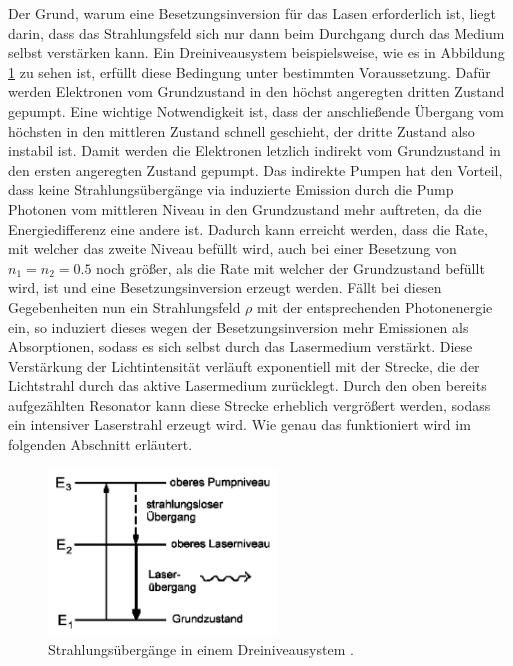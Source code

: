 Der Grund, warum eine Besetzungsinversion für das Lasen erforderlich ist, liegt darin, dass das
Strahlungsfeld sich nur dann beim Durchgang durch das Medium selbst verstärken kann.
Ein Dreiniveausystem beispielsweise, wie es in Abbildung \ref{fig:dreiniveau} zu sehen ist,
erfüllt diese Bedingung unter bestimmten Voraussetzung.
Dafür werden Elektronen vom Grundzustand in den höchst angeregten dritten Zustand gepumpt.
Eine wichtige Notwendigkeit ist, dass der anschließende Übergang vom höchsten in
den mittleren Zustand schnell geschieht, der dritte Zustand also instabil ist. Damit werden
die Elektronen letzlich indirekt vom Grundzustand in den ersten angeregten Zustand gepumpt.
Das indirekte Pumpen hat den Vorteil, dass keine Strahlungsübergänge via induzierte Emission
durch die Pump Photonen vom mittleren Niveau in den Grundzustand mehr auftreten, da die
Energiedifferenz eine andere ist. Dadurch kann erreicht werden, dass die Rate, mit welcher
das zweite Niveau befüllt wird, auch bei einer Besetzung von $n_1 = n_2 = 0.5$ noch größer,
als die Rate mit welcher der Grundzustand befüllt wird, ist und eine Besetzungsinversion
erzeugt werden. Fällt bei diesen Gegebenheiten nun ein Strahlungsfeld $\rho$ mit
der entsprechenden Photonenergie ein, so induziert dieses wegen der Besetzungsinversion mehr
Emissionen als Absorptionen, sodass es sich selbst durch das Lasermedium verstärkt.
Diese Verstärkung der Lichtintensität verläuft exponentiell mit der Strecke, die der Lichtstrahl
durch das aktive Lasermedium zurücklegt. Durch den oben bereits aufgezählten Resonator kann diese
Strecke erheblich vergrößert werden, sodass ein intensiver Laserstrahl erzeugt wird.
Wie genau das funktioniert wird im folgenden Abschnitt erläutert.

\begin{figure}[H]
  \centering
  \includegraphics[height = 4.4cm]{Pics von Buddy/dreiniveau.png}
  \caption{Strahlungsübergänge in einem Dreiniveausystem \cite{laser}.} %
  \label{fig:dreiniveau}
\end{figure}

